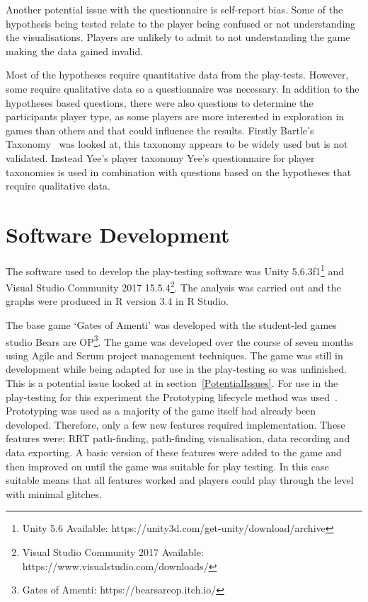 \documentclass[journal]{IEEEtran}
\begin{document}
	Another potential issue with the questionnaire is self-report bias. Some of the hypothesis being tested relate to the player being confused or not understanding the visualisations. Players are unlikely to admit to not understanding the game making the data gained invalid. 
	
	Most of the hypotheses require quantitative data from the play-tests. However, some require qualitative data so a questionnaire was necessary.  In addition to the hypotheses based questions, there were also questions to determine the participants player type, as some players are more interested in exploration in games than others and that could influence the results. 
	Firstly Bartle's Taxonomy~\cite{Bartle1996} was looked at, this taxonomy appears to be widely used but is not validated. Instead Yee's player taxonomy 
	Yee's questionnaire for player taxonomies is used in combination with questions based on the hypotheses that require qualitative data. 
	
	\section{Software Development} \label{softdev}
	The software used to develop the play-testing software was Unity 5.6.3f1\footnote[3]{Unity 5.6 Available: https://unity3d.com/get-unity/download/archive} and Visual Studio Community 2017  15.5.4\footnote[4]{Visual Studio Community 2017 Available: https://www.visualstudio.com/downloads/}.  The analysis was carried out and the graphs were produced in R version 3.4 in R Studio.
	
	The base game `Gates of Amenti' was developed with the student-led games studio Bears are OP\footnote[5]{Gates of Amenti: https://bearsareop.itch.io/}. The game was developed over the course of seven months using Agile and Scrum project management techniques. The game was still in development while being adapted for use in the play-testing so was unfinished. This is a potential issue looked at in section~\ref{PotentialIssues}. 
	For use in the play-testing for this experiment the Prototyping lifecycle method was used~\cite{isaias2015}. Prototyping was used as a majority of the game itself had already been developed. Therefore, only a few new features required implementation. These features were; RRT path-finding, path-finding visualisation, data recording and data exporting. A basic version of these features were added to the game and then improved on until the game was suitable for play testing. In this case suitable means that all features worked and players could play through the level with minimal glitches.
		
\end{document}
